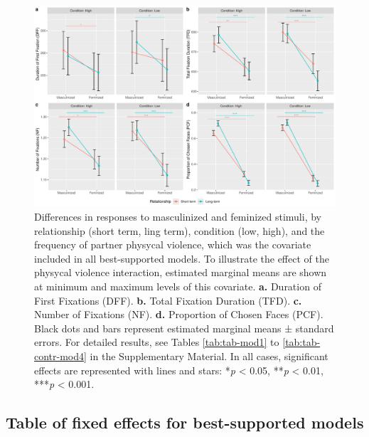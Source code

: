 \documentclass[
  bookmarksnumbered]{article}
\begin{document}
\begin{figure}
\centering
\includegraphics{Supplementary_material_files/figure-latex/unnamed-chunk-49-1.pdf}
\caption{\label{fig:unnamed-chunk-49}Differences in responses to masculinized and feminized stimuli, by relationship (short term, ling term), condition (low, high), and the frequency of partner physycal violence, which was the covariate included in all best-supported models. To illustrate the effect of the physycal violence interaction, estimated marginal means are shown at minimum and maximum levels of this covariate. \textbf{a.} Duration of First Fixations (DFF). \textbf{b.} Total Fixation Duration (TFD). \textbf{c.} Number of Fixations (NF). \textbf{d.} Proportion of Chosen Faces (PCF). Black dots and bars represent estimated marginal means ± standard errors. For detailed results, see Tables \ref{tab:tab-mod1} to \ref{tab:tab-contr-mod4} in the Supplementary Material. In all cases, significant effects are represented with lines and stars: *\emph{p} \textless{} 0.05, **\emph{p} \textless{} 0.01, ***\emph{p} \textless{} 0.001.}
\end{figure}

\subsection{Table of fixed effects for best-supported models}\label{table-of-fixed-effects-for-best-supported-models}
\end{document}
